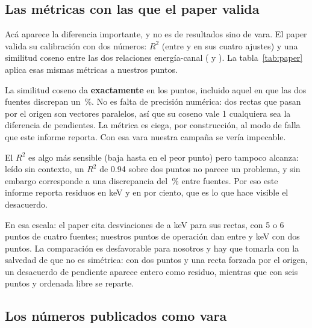 \documentclass[11pt,a4paper]{article}
\begin{document}
\subsection{Las métricas con las que el paper valida}

Acá aparece la diferencia importante, y no es de resultados sino de vara. El
paper valida su calibración con dos números: $R^2$ (entre \RdosPaperMin{} y
\RdosPaperMax{} en sus cuatro ajustes) y una similitud coseno entre las dos
relaciones energía-canal (\CosenoPaperMin{} y \CosenoPaperMax). La
tabla~\ref{tab:paper} aplica esas mismas métricas a nuestros puntos.

\begin{table}[htbp]
\centering
\caption{Nuestros puntos, medidos con las métricas de validación del paper.}
\label{tab:paper}
{\small}
\end{table}

\begin{aviso}
La similitud coseno da \textbf{\CosenoNuestro{} exactamente} en los \NPuntosTestA{}
puntos, incluido aquel en que las dos fuentes discrepan un \DesacMax\,\%. No es
falta de precisión numérica: dos rectas que pasan por el origen son vectores
paralelos, así que su coseno vale 1 cualquiera sea la diferencia de pendientes.
La métrica es ciega, por construcción, al modo de falla que este informe
reporta. Con esa vara nuestra campaña se vería impecable.
\end{aviso}

El $R^2$ es algo más sensible (baja hasta \RdosNuestroMin{} en el peor punto)
pero tampoco alcanza: leído sin contexto, un $R^2$ de 0.94 sobre dos puntos no
parece un problema, y sin embargo corresponde a una discrepancia del
\DesacMax\,\% entre fuentes. Por eso este informe reporta residuos en keV y en
por ciento, que es lo que hace visible el desacuerdo.

En esa escala: el paper cita desviaciones de \SDPaperMin{} a \SDPaperMax{} keV
para sus rectas, con 5 o 6 puntos de cuatro fuentes; nuestros puntos de
operación dan entre \SDNuestroMin{} y \SDNuestroMax{} keV con dos puntos. La
comparación es desfavorable para nosotros y hay que tomarla con la salvedad de
que no es simétrica: con dos puntos y una recta forzada por el origen, un
desacuerdo de pendiente aparece entero como residuo, mientras que con seis
puntos y ordenada libre se reparte.

\subsection{Los números publicados como vara}
\end{document}
